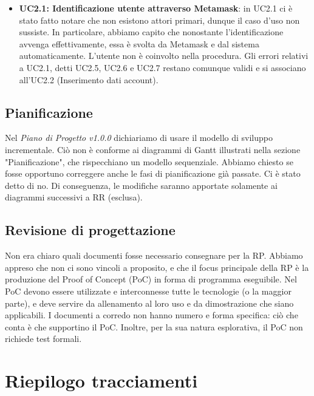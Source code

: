 \begin{itemize}
	\item \textbf{UC2.1: Identificazione utente attraverso Metamask}: in UC2.1 ci è stato fatto notare che non esistono attori primari, dunque il caso d'uso non sussiste. In particolare, abbiamo capito che nonostante l'identificazione avvenga effettivamente, essa è svolta da Metamask e dal sistema automaticamente. L'utente non è coinvolto nella procedura. Gli errori relativi a UC2.1, detti UC2.5, UC2.6 e UC2.7 restano comunque validi e si associano all'UC2.2 (Inserimento dati account).
	
\end{itemize}

\subsection{Pianificazione}
Nel \textit{Piano di Progetto v1.0.0} dichiariamo di usare il modello di sviluppo incrementale. Ciò non è conforme ai diagrammi di Gantt illustrati nella sezione "Pianificazione", che rispecchiano un modello sequenziale. Abbiamo chiesto se fosse opportuno correggere anche le fasi di pianificazione già passate. Ci è stato detto di no. Di conseguenza, le modifiche saranno apportate solamente ai diagrammi successivi a RR (esclusa).

\subsection{Revisione di progettazione}
Non era chiaro quali documenti fosse necessario consegnare per la RP. Abbiamo appreso che non ci sono vincoli a proposito, e che il focus principale della RP è la produzione del Proof of Concept (PoC) in forma di programma eseguibile. Nel PoC devono essere utilizzate e interconnesse tutte le tecnologie (o la maggior parte), e deve servire da allenamento al loro uso e da dimostrazione che siano applicabili. I documenti a corredo non hanno numero e forma specifica: ciò che conta è che supportino il PoC.
Inoltre, per la sua natura esplorativa, il PoC non richiede test formali.


\pagebreak

\section{Riepilogo tracciamenti}

	
